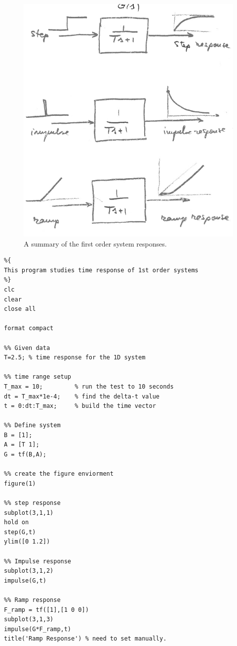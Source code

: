 \documentclass[12pt,letter]{article}
\numberwithin{ex}{section} %
\numberwithin{re}{section} %
\numberwithin{equation}{section}	%
\begin{document}
\begin{figure}[H]
	\centering
	\includegraphics[width=4.5in]{../figures/Summary_of_first_order_system_response}
	\caption{A summary of the first order system responses.}
\end{figure}


\lstset{linewidth=5.8in}
\begin{minipage}{1\textwidth}
  \begin{center}
\begin{lstlisting}
%{
This program studies time response of 1st order systems
%}
clc
clear
close all

format compact

%% Given data
T=2.5; % time response for the 1D system

%% time range setup
T_max = 10;         % run the test to 10 seconds
dt = T_max*1e-4;    % find the delta-t value 
t = 0:dt:T_max;     % build the time vector

%% Define system
B = [1];
A = [T 1];
G = tf(B,A); 

%% create the figure enviorment
figure(1)

%% step response 
subplot(3,1,1)
hold on
step(G,t)
ylim([0 1.2])

%% Impulse response
subplot(3,1,2)
impulse(G,t)

%% Ramp response
F_ramp = tf([1],[1 0 0])
subplot(3,1,3)
impulse(G*F_ramp,t)
title('Ramp Response') % need to set manually. 
\end{lstlisting}
  \end{center}
\end{minipage}
\end{document}
